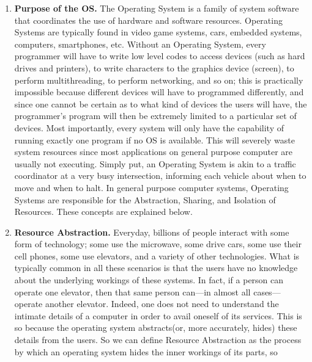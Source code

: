 \documentclass[9pt]{article}
\begin{document}
\begin{enumerate}
   \item \textbf{Purpose of the OS.} The Operating System is a family of
         system software that coordinates the use of hardware and software
         resources. Operating Systems are typically found in video game systems,
         cars, embedded systems, computers, smartphones, etc. Without an
         Operating System, every programmer will have to write low level codes
         to access devices (such as hard drives and printers), to write 
         characters to the graphics device (screen), to perform multithreading,
         to perform networking, and so on; this is practically impossible because
         different devices will have to programmed differently, and since one
         cannot be certain as to what kind of devices the users will have, the
         programmer's program will then be extremely limited to a particular set
         of devices. Most importantly, every system will only have the
         capability of running exactly one program if no OS is available. This
         will severely waste system resources since most applications on
         general purpose computer are usually not executing. Simply put, an
         Operating System is akin to a traffic coordinator at a very busy
         intersection, informing each vehicle about when to move and when to
         halt. In general purpose computer systems, Operating Systems are
         responsible for the Abstraction, Sharing, and Isolation of Resources.
         These concepts are explained below.
   \item \textbf{Resource Abstraction.} Everyday, billions of people interact
         with some form of technology; some use the microwave, some drive cars,
         some use their cell phones, some use elevators, and a variety of other
         technologies. What is typically common in all these scenarios is that
         the users have no knowledge about the underlying workings of these
         systems. In fact, if a person can operate one elevator, then that same
         person can---in almost all cases---operate another elevator. Indeed,
         one does not need to understand the intimate details of a computer in
         order to avail oneself of its services. This is so because the
         operating system abstracts(or, more accurately, hides) these details
         from the users. So we can define Resource Abstraction as the process
         by which an operating system hides the inner workings of its parts, so

\end{enumerate}
\end{document}
